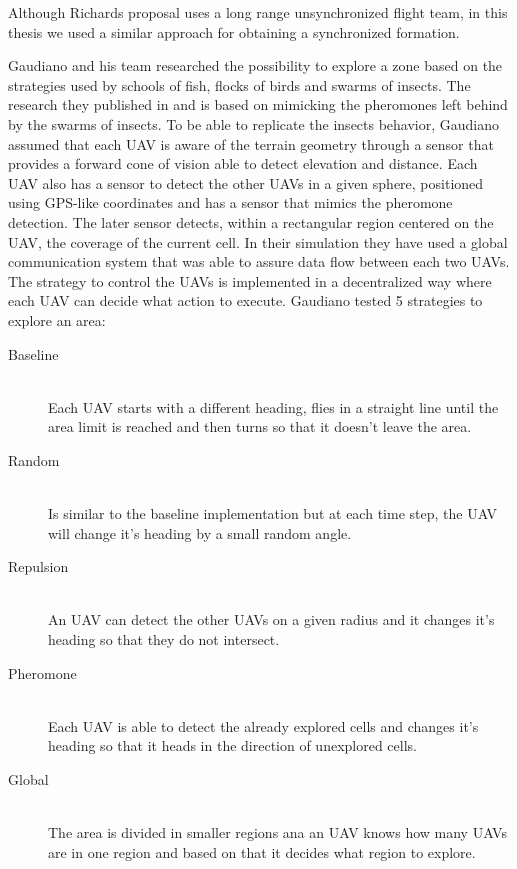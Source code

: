 Although Richards proposal uses a long range unsynchronized flight team, in this
thesis we used a similar approach for obtaining a synchronized formation.

Gaudiano and his team researched the possibility to explore a zone based on the 
strategies used by schools of fish, flocks of birds and swarms of insects. 
The research they published in \cite{bugs} and \cite{c2-paradigm} is based on 
mimicking the pheromones left behind by the swarms of insects. To be able to 
replicate the insects behavior, Gaudiano assumed that each UAV is aware of the 
terrain geometry through a sensor that provides a forward cone of vision
able to detect elevation and distance. Each UAV also has a sensor to detect the other UAVs 
in a given sphere, positioned using GPS-like coordinates and has a sensor
that mimics the pheromone detection. The later sensor detects, within a rectangular
region centered on the UAV, the coverage of the current cell. In their simulation
they have used a global communication system that was able to assure data flow
between each two UAVs. The strategy to control the UAVs is implemented in a 
decentralized way where each UAV can decide what action to execute. Gaudiano 
tested 5 strategies to explore an area:

\begin{description}
\item[Baseline] \hfill \\ Each UAV starts with a different heading, flies in a straight line
until the area limit is reached and then turns so that it doesn't leave the area.
\item[Random] \hfill \\ Is similar to the baseline implementation but at each time step, 
the UAV will change it's heading by a small random angle.
\item[Repulsion] \hfill \\ An UAV can detect the other UAVs on a given radius and it changes
it's heading so that they do not intersect.
\item[Pheromone] \hfill \\ Each UAV is able to detect the already explored cells and changes it's
heading so that it heads in the direction of unexplored cells.
\item[Global]  \hfill \\ The area is divided in smaller regions ana an UAV knows 
how many UAVs are in one region and based on that it decides what region to explore.
\end{description}


